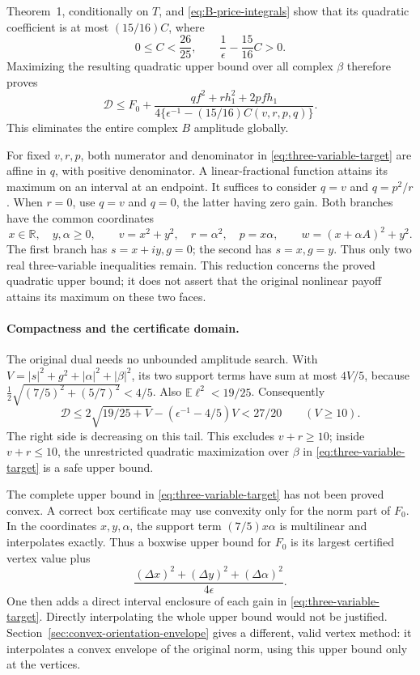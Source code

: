 Theorem~1, conditionally on $T$, and
\eqref{eq:B-price-integrals} show that its quadratic coefficient is at most
$(15/16)C$, where
\[
 0\le C<\frac{26}{25},\qquad
 \frac1\epsilon-\frac{15}{16}C>0.
\]
Maximizing the resulting quadratic upper bound over all complex $\beta$
therefore proves
\begin{equation}
 \boxed{\quad
 \mathcal D\le F_0+
 \frac{qf^2+rh_1^2+2pfh_1}
 {4\{\epsilon^{-1}-(15/16)C(v,r,p,q)\}}.
 \quad}
 \label{eq:three-variable-target}
\end{equation}
This eliminates the entire complex $B$ amplitude globally.

For fixed $v,r,p$, both numerator and denominator in
\eqref{eq:three-variable-target} are affine in $q$, with positive
denominator.  A linear-fractional function attains its maximum on an
interval at an endpoint.  It suffices to consider $q=v$ and $q=p^2/r$.
When $r=0$, use $q=v$ and $q=0$, the latter having zero gain.  Both branches
have the common coordinates
\[
 x\in\mathbb R,\quad y,\alpha\ge0,\qquad
 v=x^2+y^2,\quad r=\alpha^2,\quad p=x\alpha,
 \qquad w=(x+\alpha A)^2+y^2.
\]
The first branch has $s=x+iy,g=0$; the second has $s=x,g=y$.
Thus only two real three-variable inequalities remain.  This reduction
concerns the proved quadratic upper bound; it does not assert that the
original nonlinear payoff attains its maximum on these two faces.

\paragraph{Compactness and the certificate domain.}
The original dual needs no unbounded amplitude search.  With
$V=|s|^2+g^2+|\alpha|^2+|\beta|^2$, its two support terms have sum at most
$4V/5$, because
$\tfrac12\sqrt{(7/5)^2+(5/7)^2}<4/5$.
Also $\mathbb E\ell^2<19/25$.  Consequently
\[
 \mathcal D\le 2\sqrt{19/25+V}
              -(\epsilon^{-1}-4/5)V<27/20\qquad(V\ge10).
\]
The right side is decreasing on this tail.  This excludes $v+r\ge10$;
inside $v+r\le10$, the unrestricted quadratic maximization over $\beta$
in \eqref{eq:three-variable-target} is a safe upper bound.

The complete upper bound in \eqref{eq:three-variable-target} has not been
proved convex.  A correct box certificate may use convexity only for the
norm part of $F_0$.  In the coordinates $x,y,\alpha$, the support term
$(7/5)x\alpha$ is multilinear and interpolates exactly.  Thus a boxwise
upper bound for $F_0$ is its largest certified vertex value plus
\[
 \frac{(\Delta x)^2+(\Delta y)^2+(\Delta\alpha)^2}{4\epsilon}.
\]
One then adds a direct interval enclosure of each gain in
\eqref{eq:three-variable-target}.  Directly interpolating the whole upper bound would not be justified.
Section~\ref{sec:convex-orientation-envelope} gives a different, valid
vertex method: it interpolates a convex envelope of the original norm,
using this upper bound only at the vertices.

